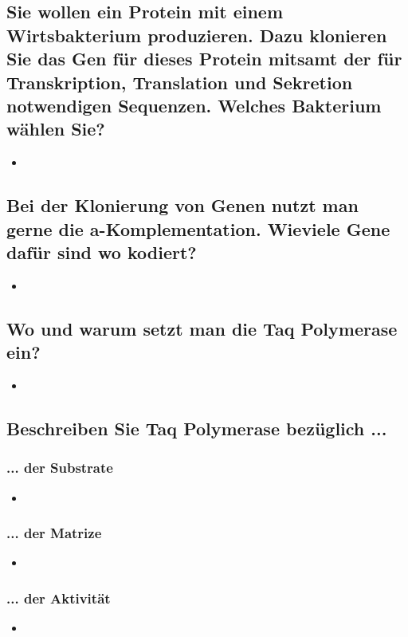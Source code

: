 \documentclass{article}
\begin{document}
\subsection*{Sie wollen ein Protein mit einem Wirtsbakterium produzieren. Dazu klonieren
Sie das Gen für dieses Protein mitsamt der für Transkription, Translation und Sekretion notwendigen Sequenzen. Welches Bakterium wählen Sie?}
\begin{itemize}     \item  \end{itemize}


\subsection*{Bei der Klonierung von Genen nutzt man gerne die a-Komplementation.
Wieviele Gene dafür sind wo kodiert?}
\begin{itemize}     \item  \end{itemize}

\subsection*{Wo und warum setzt man die Taq Polymerase ein?}
\begin{itemize}     \item  \end{itemize}
\subsection*{Beschreiben Sie Taq Polymerase bezüglich ...}
\subsubsection*{... der Substrate}
\begin{itemize}     \item  \end{itemize}
\subsubsection*{... der Matrize}
\begin{itemize}     \item  \end{itemize}
\subsubsection*{... der Aktivität}
\begin{itemize}     \item  \end{itemize}
\end{document}
